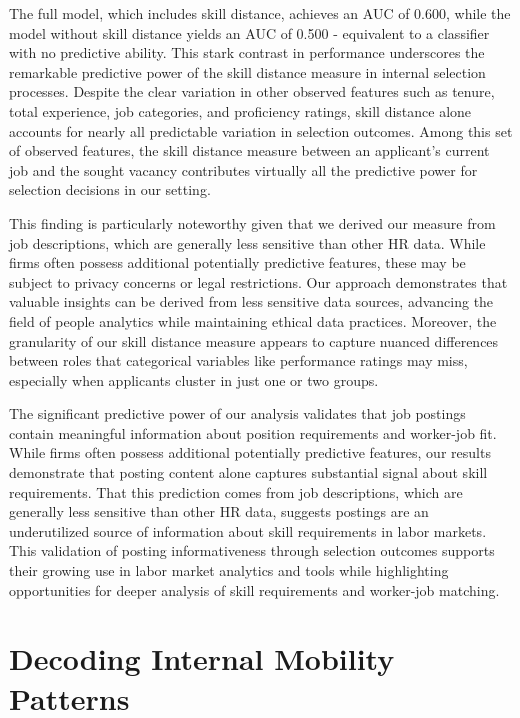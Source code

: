\documentclass[12pt]{article}
\begin{document}
The full model, which includes skill distance, achieves an AUC of 0.600, while the model without skill distance yields an AUC of 0.500 - equivalent to a classifier with no predictive ability. This stark contrast in performance underscores the remarkable predictive power of the skill distance measure in internal selection processes. Despite the clear variation in other observed features such as tenure, total experience, job categories, and proficiency ratings, skill distance alone accounts for nearly all predictable variation in selection outcomes. Among this set of observed features, the skill distance measure between an applicant's current job and the sought vacancy contributes virtually all the predictive power for selection decisions in our setting.

This finding is particularly noteworthy given that we derived our measure from job descriptions, which are generally less sensitive than other HR data. While firms often possess additional potentially predictive features, these may be subject to privacy concerns or legal restrictions. Our approach demonstrates that valuable insights can be derived from less sensitive data sources, advancing the field of people analytics while maintaining ethical data practices. Moreover, the granularity of our skill distance measure appears to capture nuanced differences between roles that categorical variables like performance ratings may miss, especially when applicants cluster in just one or two groups.


The significant predictive power of our analysis validates that job postings contain meaningful information about position requirements and worker-job fit. While firms often possess additional potentially predictive features, our results demonstrate that posting content alone captures substantial signal about skill requirements. That this prediction comes from job descriptions, which are generally less sensitive than other HR data, suggests postings are an underutilized source of information about skill requirements in labor markets. This validation of posting informativeness through selection outcomes supports their growing use in labor market analytics and tools while highlighting opportunities for deeper analysis of skill requirements and worker-job matching. 


\section{Decoding Internal Mobility Patterns}\label{sec:internal_mobility_patterns}
\end{document}
